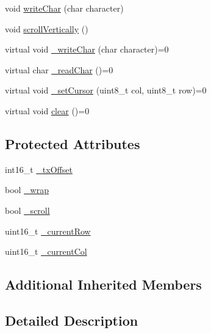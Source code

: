 \begin{DoxyCompactItemize}
\item 
void \hyperlink{class_m_h_v___display___character_af5ecc9a12e46c7cd53827fe836925055}{write\-Char} (char character)
\item 
void \hyperlink{class_m_h_v___display___character_abde235de63e41a074ca177d284ec7227}{scroll\-Vertically} ()
\item 
virtual void \hyperlink{class_m_h_v___display___character_a915c379278f0779058f70d069bd07679}{\-\_\-write\-Char} (char character)=0
\item 
virtual char \hyperlink{class_m_h_v___display___character_a6a6d98f3dfd38bd860fba82e6a4dffaa}{\-\_\-read\-Char} ()=0
\item 
virtual void \hyperlink{class_m_h_v___display___character_a5405211d8f33d7559e198a9453c54d88}{\-\_\-set\-Cursor} (uint8\-\_\-t col, uint8\-\_\-t row)=0
\item 
virtual void \hyperlink{class_m_h_v___display___character_a99fe866ca4625712e107c556e5d4d9c8}{clear} ()=0
\end{DoxyCompactItemize}
\subsection*{Protected Attributes}
\begin{DoxyCompactItemize}
\item 
int16\-\_\-t \hyperlink{class_m_h_v___display___character_ae32f200ae564067a82869ac47409d7b6}{\-\_\-tx\-Offset}
\item 
bool \hyperlink{class_m_h_v___display___character_aa227789e26be424c4aead2d27a049f36}{\-\_\-wrap}
\item 
bool \hyperlink{class_m_h_v___display___character_a18c24ac662d632a75c83fb9940b7d876}{\-\_\-scroll}
\item 
uint16\-\_\-t \hyperlink{class_m_h_v___display___character_a69ba315c51c4f3f2795709c79e02856f}{\-\_\-current\-Row}
\item 
uint16\-\_\-t \hyperlink{class_m_h_v___display___character_aa07a2b0d5b352e643857c2fd844c671c}{\-\_\-current\-Col}
\end{DoxyCompactItemize}
\subsection*{Additional Inherited Members}


\subsection{Detailed Description}
